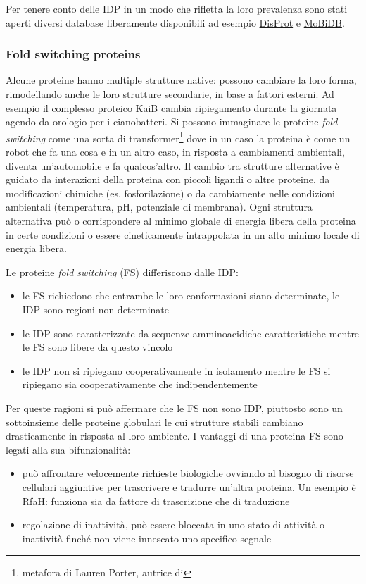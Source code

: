 {\par Per tenere conto delle IDP in un modo che rifletta la loro prevalenza sono stati aperti diversi database liberamente disponibili ad esempio \href{http://www.disprot.org}{DisProt} e \href{http://MoBiDB.bio.unipd.it}{MoBiDB}.

\subsubsection{Fold switching proteins} \label{sec:fold-switching-proteins}
{
Alcune proteine hanno multiple strutture native: possono cambiare la loro forma, rimodellando anche le loro strutture secondarie, in base a fattori esterni. Ad esempio il complesso proteico KaiB cambia ripiegamento durante la giornata agendo da orologio per i cianobatteri. Si possono immaginare le proteine \textit{fold switching} come una sorta di transformer\footnote{metafora di Lauren Porter\supercite{porterYT}, autrice di\supercite{porter2018extant}} dove in un caso la proteina è come un robot che fa una cosa e in un altro caso, in risposta a cambiamenti ambientali, diventa un'automobile e fa qualcos'altro. Il cambio tra strutture alternative è guidato da interazioni della proteina con piccoli ligandi o altre proteine, da modificazioni chimiche (es. fosforilazione) o da cambiamente nelle condizioni ambientali (temperatura, pH, potenziale di membrana). Ogni struttura alternativa può o corrispondere al minimo globale di energia libera della proteina in certe condizioni o essere cineticamente intrappolata in un alto minimo locale di energia libera\supercite{varela2019kinetic}.

\par Le proteine \textit{fold switching} (FS) differiscono dalle IDP\supercite{porter2018extant}: 

\begin{itemize}
	\item le FS richiedono che entrambe le loro conformazioni siano determinate, le IDP sono regioni non determinate
	\item le IDP sono caratterizzate da sequenze amminoacidiche caratteristiche mentre le FS sono libere da questo vincolo
	\item le IDP non si ripiegano cooperativamente in isolamento mentre le FS si ripiegano sia cooperativamente che indipendentemente
\end{itemize}

Per queste ragioni si può affermare che le FS non sono IDP, piuttosto sono un sottoinsieme delle proteine globulari le cui strutture stabili cambiano drasticamente in risposta al loro ambiente. I vantaggi di una proteina FS sono legati alla sua bifunzionalità:
\begin{itemize}
	\item può affrontare velocemente richieste biologiche ovviando al bisogno di risorse cellulari aggiuntive per trascrivere e tradurre un'altra proteina. Un esempio è RfaH: funziona sia da fattore di trascrizione che di traduzione
	\item regolazione di inattività, può essere bloccata in uno stato di attività o inattività finché non viene innescato uno specifico segnale
\end{itemize}

}}
